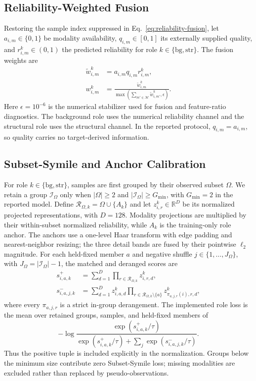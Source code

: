 \documentclass[letterpaper]{article}
\begin{document}
\subsection{Reliability-Weighted Fusion}
Restoring the sample index suppressed in Eq.~\ref{eq:reliability-fusion}, let $a_{i,m}\in\{0,1\}$ be modality availability, $q_{i,m}\in[0,1]$ its externally supplied quality, and $r_{i,m}^k\in(0,1)$ the predicted reliability for role $k\in\{\mathrm{bg},\mathrm{str}\}$. The fusion weights are
\begin{align}
\widetilde w_{i,m}^k
&=a_{i,m}q_{i,m}r_{i,m}^k,\nonumber\\
w_{i,m}^k
&=\frac{\widetilde w_{i,m}^k}
{\max\!\left(\sum_{m'\in\mathcal M}\widetilde w_{i,m'}^k,\epsilon\right)}.
\label{eq:fusion-normalization}
\end{align}
Here $\epsilon=10^{-6}$ is the numerical stabilizer used for fusion and feature-ratio diagnostics.
The background role uses the numerical reliability channel and the structural role uses the structural channel. In the reported protocol, $q_{i,m}=a_{i,m}$, so quality carries no target-derived information.

\subsection{Subset-Symile and Anchor Calibration}
For role $k\in\{\mathrm{bg},\mathrm{str}\}$, samples are first grouped by their observed subset $\Omega$. We retain a group $\mathcal I_\Omega$ only when $|\Omega|\ge2$ and $|\mathcal I_\Omega|\ge G_{\min}$, with $G_{\min}=2$ in the reported model. Define $\mathcal R_{\Omega,k}=\Omega\cup\{A_k\}$ and let $z^k_{i,r}\in\mathbb R^D$ be its normalized projected representations, with $D=128$. Modality projections are multiplied by their within-subset normalized reliability, while $A_k$ is the training-only role anchor. The anchors use a one-level Haar transform with edge padding and nearest-neighbor resizing; the three detail bands are fused by their pointwise $\ell_2$ magnitude. For each held-fixed member $a$ and negative shuffle $j\in\{1,\ldots,J_\Omega\}$, with $J_\Omega=|\mathcal I_\Omega|-1$, the matched and deranged scores are
\begin{align}
s^+_{i,a,k}
&=\sum_{d=1}^{D}\prod_{r\in\mathcal R_{\Omega,k}} z^k_{i,r,d},\\
s^-_{i,a,j,k}
&=\sum_{d=1}^{D}z^k_{i,a,d}
\prod_{r\in\mathcal R_{\Omega,k}\setminus\{a\}}
z^k_{\pi_{a,j,r}(i),r,d},
\end{align}
where every $\pi_{a,j,r}$ is a strict in-group derangement. The implemented role loss is the mean over retained groups, samples, and held-fixed members of
\begin{equation}
-\log
\frac{\exp(s^+_{i,a,k}/\tau)}
{\exp(s^+_{i,a,k}/\tau)+\sum_j\exp(s^-_{i,a,j,k}/\tau)}.
\label{eq:subset-symile-detail}
\end{equation}
Thus the positive tuple is included explicitly in the normalization. Groups below the minimum size contribute zero Subset-Symile loss; missing modalities are excluded rather than replaced by pseudo-observations.
\end{document}
